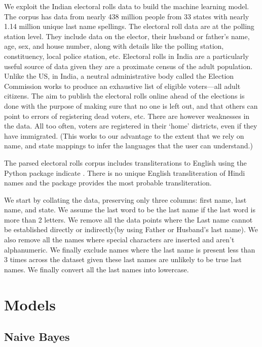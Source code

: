 \documentclass[11pt,  letterpaper]{article}
\begin{document}
We exploit the Indian electoral rolls data \citep{DVN/OG47IV_2023, DVN/MUEGDT_2018} to build the machine learning model. The corpus has data from nearly 438 million people from 33 states with nearly 1.14 million unique last name spellings. The electoral roll data are at the polling station level. They include data on the elector, their husband or father’s name, age, sex, and house number, along with details like the polling station, constituency, local police station, etc. Electoral rolls in India are a particularly useful source of data given they are a proximate census of the adult population. Unlike the US, in India, a neutral administrative body called the Election Commission works to produce an exhaustive list of eligible voters—all adult citizens. The aim to publish the electoral rolls online ahead of the elections is done with the purpose of making sure that no one is left out, and that others can point to errors of registering dead voters, etc. There are however weaknesses in the data. All too often, voters are registered in their ‘home’ districts, even if they have immigrated. (This works to our advantage to the extent that we rely on name, and state mappings to infer the languages that the user can understand.)

The parsed electoral rolls corpus \citep{DVN/MUEGDT_2018} includes transliterations to English using the Python package indicate \citep{Chintalapati_Indicate_Transliterate_Indic_2022}. There is no unique English transliteration of Hindi names and the package provides the most probable transliteration. 

We start by collating the data, preserving only three columns: first name, last name, and state. We assume the last word to be the last name if the last word is more than 2 letters. We remove all the data points where the Last name cannot be established directly or indirectly(by using Father or Husband’s last name). We also remove all the names where special characters are inserted and aren’t alphanumeric. We finally exclude names where the last name is present less than 3 times across the dataset given these last names are unlikely to be true last names. We finally convert all the last names into lowercase. 

\section{Models}

\subsection{Naive Bayes}
\end{document}
